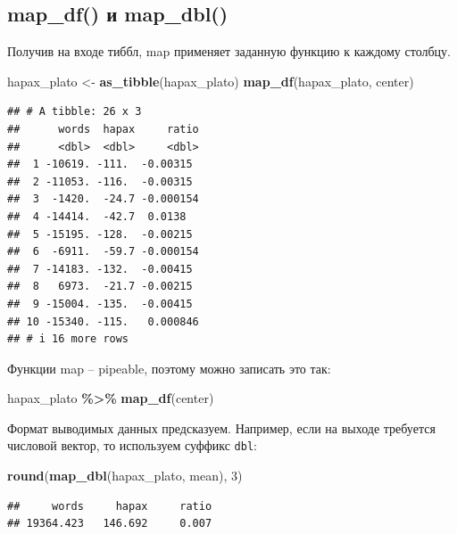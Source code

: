 \documentclass[
]{book}
\newenvironment{Shaded}{\begin{snugshade}}{\end{snugshade}}
\newcommand{\DecValTok}[1]{\textcolor[rgb]{0.00,0.00,0.81}{#1}}
\newcommand{\FunctionTok}[1]{\textcolor[rgb]{0.13,0.29,0.53}{\textbf{#1}}}
\newcommand{\NormalTok}[1]{#1}
\newcommand{\OtherTok}[1]{\textcolor[rgb]{0.56,0.35,0.01}{#1}}
\newcommand{\SpecialCharTok}[1]{\textcolor[rgb]{0.81,0.36,0.00}{\textbf{#1}}}
\theoremstyle{definition}
\theoremstyle{definition}
\theoremstyle{definition}
\theoremstyle{definition}
\theoremstyle{remark}
\begin{document}
\hypertarget{map_df-ux438-map_dbl}{%
\subsection{map\_df() и map\_dbl()}\label{map_df-ux438-map_dbl}}

Получив на входе тиббл, map применяет заданную функцию к каждому столбцу.

\begin{Shaded}
\begin{Highlighting}[]
\NormalTok{hapax\_plato }\OtherTok{\textless{}{-}} \FunctionTok{as\_tibble}\NormalTok{(hapax\_plato)}
\FunctionTok{map\_df}\NormalTok{(hapax\_plato, center) }
\end{Highlighting}
\end{Shaded}

\begin{verbatim}
## # A tibble: 26 x 3
##      words  hapax     ratio
##      <dbl>  <dbl>     <dbl>
##  1 -10619. -111.  -0.00315 
##  2 -11053. -116.  -0.00315 
##  3  -1420.  -24.7 -0.000154
##  4 -14414.  -42.7  0.0138  
##  5 -15195. -128.  -0.00215 
##  6  -6911.  -59.7 -0.000154
##  7 -14183. -132.  -0.00415 
##  8   6973.  -21.7 -0.00215 
##  9 -15004. -135.  -0.00415 
## 10 -15340. -115.   0.000846
## # i 16 more rows
\end{verbatim}

Функции map -- pipeable, поэтому можно записать это так:

\begin{Shaded}
\begin{Highlighting}[]
\NormalTok{hapax\_plato }\SpecialCharTok{\%\textgreater{}\%} \FunctionTok{map\_df}\NormalTok{(center)}
\end{Highlighting}
\end{Shaded}

Формат выводимых данных предсказуем. Например, если на выходе требуется числовой вектор, то используем суффикс \texttt{dbl}:

\begin{Shaded}
\begin{Highlighting}[]
\FunctionTok{round}\NormalTok{(}\FunctionTok{map\_dbl}\NormalTok{(hapax\_plato, mean), }\DecValTok{3}\NormalTok{)}
\end{Highlighting}
\end{Shaded}

\begin{verbatim}
##     words     hapax     ratio 
## 19364.423   146.692     0.007
\end{verbatim}
\end{document}
